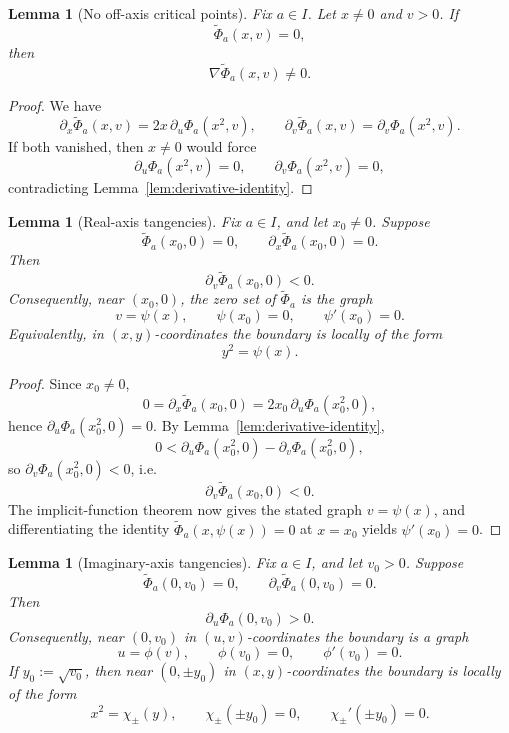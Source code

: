 \documentclass[11pt]{article}
\newtheorem{lemma}[theorem]{Lemma}
\begin{document}
\begin{lemma}[No off-axis critical points]\label{lem:no-off-axis-critical}
Fix \(a\in I\). Let \(x\neq 0\) and \(v>0\). If
\[
\widetilde\Phi_a(x,v)=0,
\]
then
\[
\nabla \widetilde\Phi_a(x,v)\neq 0.
\]
\end{lemma}

\begin{proof}
We have
\[
\partial_x\widetilde\Phi_a(x,v)=2x\,\partial_u\Phi_a(x^2,v),
\qquad
\partial_v\widetilde\Phi_a(x,v)=\partial_v\Phi_a(x^2,v).
\]
If both vanished, then \(x\neq 0\) would force
\[
\partial_u\Phi_a(x^2,v)=0,
\qquad
\partial_v\Phi_a(x^2,v)=0,
\]
contradicting Lemma~\ref{lem:derivative-identity}.
\end{proof}

\begin{lemma}[Real-axis tangencies]\label{lem:real-axis-tangency}
Fix \(a\in I\), and let \(x_0\neq 0\). Suppose
\[
\widetilde\Phi_a(x_0,0)=0,
\qquad
\partial_x\widetilde\Phi_a(x_0,0)=0.
\]
Then
\[
\partial_v\widetilde\Phi_a(x_0,0)<0.
\]
Consequently, near \((x_0,0)\), the zero set of \(\widetilde\Phi_a\) is the graph
\[
v=\psi(x),
\qquad
\psi(x_0)=0,
\qquad
\psi'(x_0)=0.
\]
Equivalently, in \((x,y)\)-coordinates the boundary is locally of the form
\[
y^2=\psi(x).
\]
\end{lemma}

\begin{proof}
Since \(x_0\neq 0\),
\[
0=\partial_x\widetilde\Phi_a(x_0,0)=2x_0\,\partial_u\Phi_a(x_0^2,0),
\]
hence \(\partial_u\Phi_a(x_0^2,0)=0\). By Lemma~\ref{lem:derivative-identity},
\[
0<\partial_u\Phi_a(x_0^2,0)-\partial_v\Phi_a(x_0^2,0),
\]
so \(\partial_v\Phi_a(x_0^2,0)<0\), i.e.
\[
\partial_v\widetilde\Phi_a(x_0,0)<0.
\]
The implicit-function theorem now gives the stated graph \(v=\psi(x)\), and differentiating the identity \(\widetilde\Phi_a(x,\psi(x))=0\) at \(x=x_0\) yields \(\psi'(x_0)=0\).
\end{proof}

\begin{lemma}[Imaginary-axis tangencies]\label{lem:imag-axis-tangency}
Fix \(a\in I\), and let \(v_0>0\). Suppose
\[
\widetilde\Phi_a(0,v_0)=0,
\qquad
\partial_v\widetilde\Phi_a(0,v_0)=0.
\]
Then
\[
\partial_u\Phi_a(0,v_0)>0.
\]
Consequently, near \((0,v_0)\) in \((u,v)\)-coordinates the boundary is a graph
\[
u=\phi(v),
\qquad
\phi(v_0)=0,
\qquad
\phi'(v_0)=0.
\]
If \(y_0:=\sqrt{v_0}\), then near \((0,\pm y_0)\) in \((x,y)\)-coordinates the boundary is locally of the form
\[
x^2=\chi_\pm(y),
\qquad
\chi_\pm(\pm y_0)=0,
\qquad
\chi_\pm'(\pm y_0)=0.
\]
\end{lemma}
\end{document}
